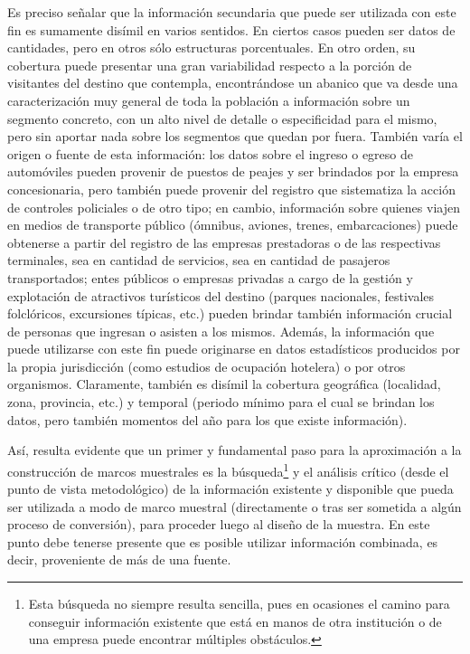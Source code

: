 \documentclass[
]{book}
\begin{document}
Es preciso señalar que la información secundaria que puede ser utilizada con este fin es sumamente disímil en varios sentidos. En ciertos casos pueden ser datos de cantidades, pero en otros sólo estructuras porcentuales. En otro orden, su cobertura puede presentar una gran variabilidad respecto a la porción de visitantes del destino que contempla, encontrándose un abanico que va desde una caracterización muy general de toda la población a información sobre un segmento concreto, con un alto nivel de detalle o especificidad para el mismo, pero sin aportar nada sobre los segmentos que quedan por fuera. También varía el origen o fuente de esta información: los datos sobre el ingreso o egreso de automóviles pueden provenir de puestos de peajes y ser brindados por la empresa concesionaria, pero también puede provenir del registro que sistematiza la acción de controles policiales o de otro tipo; en cambio, información sobre quienes viajen en medios de transporte público (ómnibus, aviones, trenes, embarcaciones) puede obtenerse a partir del registro de las empresas prestadoras o de las respectivas terminales, sea en cantidad de servicios, sea en cantidad de pasajeros transportados; entes públicos o empresas privadas a cargo de la gestión y explotación de atractivos turísticos del destino (parques nacionales, festivales folclóricos, excursiones típicas, etc.) pueden brindar también información crucial de personas que ingresan o asisten a los mismos. Además, la información que puede utilizarse con este fin puede originarse en datos estadísticos producidos por la propia jurisdicción (como estudios de ocupación hotelera) o por otros organismos. Claramente, también es disímil la cobertura geográfica (localidad, zona, provincia, etc.) y temporal (periodo mínimo para el cual se brindan los datos, pero también momentos del año para los que existe información).

Así, resulta evidente que un primer y fundamental paso para la aproximación a la construcción de marcos muestrales es la búsqueda\footnote{Esta búsqueda no siempre resulta sencilla, pues en ocasiones el camino para conseguir información existente que está en manos de otra institución o de una empresa puede encontrar múltiples obstáculos.} y el análisis crítico (desde el punto de vista metodológico) de la información existente y disponible que pueda ser utilizada a modo de marco muestral (directamente o tras ser sometida a algún proceso de conversión), para proceder luego al diseño de la muestra. En este punto debe tenerse presente que es posible utilizar información combinada, es decir, proveniente de más de una fuente.
\end{document}
